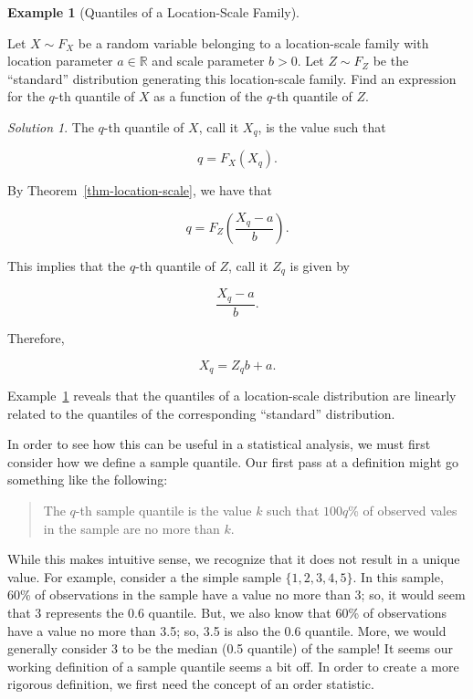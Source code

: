 \documentclass[
  letterpaper,
  DIV=11,
  numbers=noendperiod]{scrreprt}
\theoremstyle{definition}
\theoremstyle{definition}
\newtheorem{example}{Example}[chapter]
\theoremstyle{plain}
\theoremstyle{remark}
\newtheorem*{solution}{Solution}
\begin{document}
\begin{example}[Quantiles of a Location-Scale
Family]\protect\hypertarget{exm-location-scale-quantiles}{}\label{exm-location-scale-quantiles}

Let \(X \sim F_X\) be a random variable belonging to a location-scale
family with location parameter \(a \in \mathbb{R}\) and scale parameter
\(b > 0\). Let \(Z \sim F_Z\) be the ``standard'' distribution
generating this location-scale family. Find an expression for the
\(q\)-th quantile of \(X\) as a function of the \(q\)-th quantile of
\(Z\).

\end{example}

\begin{solution}

The \(q\)-th quantile of \(X\), call it \(X_q\), is the value such that

\[q = F_X\left(X_q\right).\]

By Theorem~\ref{thm-location-scale}, we have that

\[q = F_Z\left(\frac{X_q - a}{b}\right).\]

This implies that the \(q\)-th quantile of \(Z\), call it \(Z_q\) is
given by

\[\frac{X_q - a}{b}.\]

Therefore,

\[X_q = Z_q b + a.\]

\end{solution}

Example~\ref{exm-location-scale-quantiles} reveals that the quantiles of
a location-scale distribution are linearly related to the quantiles of
the corresponding ``standard'' distribution.

In order to see how this can be useful in a statistical analysis, we
must first consider how we define a sample quantile. Our first pass at a
definition might go something like the following:

\begin{quote}
The \(q\)-th sample quantile is the value \(k\) such that \(100q\)\% of
observed vales in the sample are no more than \(k\).
\end{quote}

While this makes intuitive sense, we recognize that it does not result
in a unique value. For example, consider a the simple sample
\(\{1, 2, 3, 4, 5\}\). In this sample, 60\% of observations in the
sample have a value no more than 3; so, it would seem that 3 represents
the 0.6 quantile. But, we also know that 60\% of observations have a
value no more than 3.5; so, 3.5 is also the 0.6 quantile. More, we would
generally consider 3 to be the median (0.5 quantile) of the sample! It
seems our working definition of a sample quantile seems a bit off. In
order to create a more rigorous definition, we first need the concept of
an order statistic.
\end{document}
